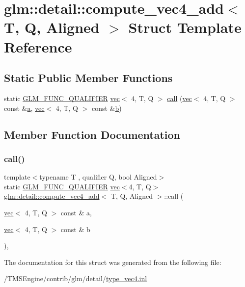 \hypertarget{structglm_1_1detail_1_1compute__vec4__add}{}\section{glm\+:\+:detail\+:\+:compute\+\_\+vec4\+\_\+add$<$ T, Q, Aligned $>$ Struct Template Reference}
\label{structglm_1_1detail_1_1compute__vec4__add}
\subsection*{Static Public Member Functions}
\begin{DoxyCompactItemize}
\item 
static \hyperlink{setup_8hpp_a33fdea6f91c5f834105f7415e2a64407}{G\+L\+M\+\_\+\+F\+U\+N\+C\+\_\+\+Q\+U\+A\+L\+I\+F\+I\+ER} \hyperlink{structglm_1_1vec}{vec}$<$ 4, T, Q $>$ \hyperlink{structglm_1_1detail_1_1compute__vec4__add_a31e900b7f6b77e1053d4488b6fb81715}{call} (\hyperlink{structglm_1_1vec}{vec}$<$ 4, T, Q $>$ const \&\hyperlink{_s_d_l__opengl__glext_8h_a3309789fc188587d666cda5ece79cf82}{a}, \hyperlink{structglm_1_1vec}{vec}$<$ 4, T, Q $>$ const \&\hyperlink{_s_d_l__opengl__glext_8h_a0f71581a41fd2264c8944126dabbd010}{b})
\end{DoxyCompactItemize}


\subsection{Member Function Documentation}
\mbox{\label{structglm_1_1detail_1_1compute__vec4__add_a31e900b7f6b77e1053d4488b6fb81715}} 
\subsubsection{\texorpdfstring{call()}{call()}}
{\footnotesize\ttfamily template$<$typename T , qualifier Q, bool Aligned$>$ \\
static \hyperlink{setup_8hpp_a33fdea6f91c5f834105f7415e2a64407}{G\+L\+M\+\_\+\+F\+U\+N\+C\+\_\+\+Q\+U\+A\+L\+I\+F\+I\+ER} \hyperlink{structglm_1_1vec}{vec}$<$4, T, Q$>$ \hyperlink{structglm_1_1detail_1_1compute__vec4__add}{glm\+::detail\+::compute\+\_\+vec4\+\_\+add}$<$ T, Q, Aligned $>$\+::call (\begin{DoxyParamCaption}\item[{\hyperlink{structglm_1_1vec}{vec}$<$ 4, T, Q $>$ const \&}]{a,  }\item[{\hyperlink{structglm_1_1vec}{vec}$<$ 4, T, Q $>$ const \&}]{b }\end{DoxyParamCaption})\hspace{0.3cm}{\ttfamily [inline]}, {\ttfamily [static]}}



The documentation for this struct was generated from the following file\+:\begin{DoxyCompactItemize}
\item 
/\+T\+M\+S\+Engine/contrib/glm/detail/\hyperlink{type__vec4_8inl}{type\+\_\+vec4.\+inl}\end{DoxyCompactItemize}
